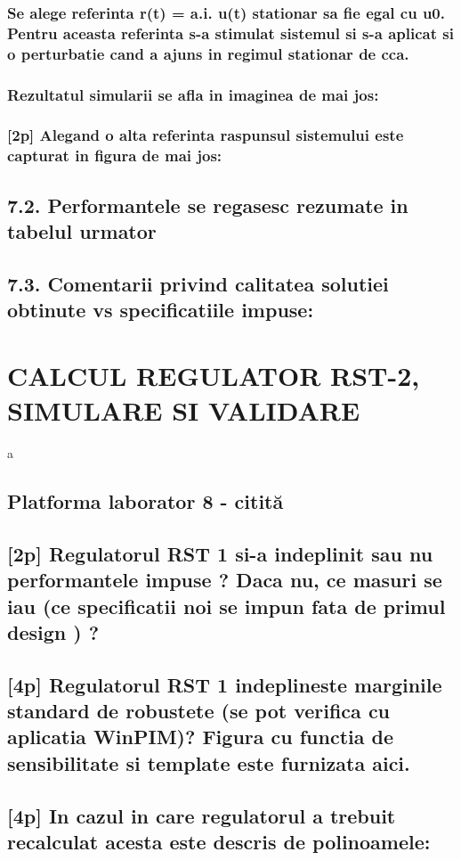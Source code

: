 \documentclass[12pt,english]{article}
\begin{document}
\subsubsection {Se alege referinta r(t) = a.i. u(t) stationar sa fie egal cu u0. Pentru aceasta referinta s-a stimulat sistemul si s-a aplicat si o perturbatie cand a ajuns in regimul stationar de cca.}
\subsubsection {Rezultatul simularii se afla in imaginea de mai jos: }
\subsubsection {[2p] Alegand o alta referinta raspunsul sistemului este capturat in figura de mai jos: }
\subsection {7.2. Performantele se regasesc rezumate in tabelul urmator }
\subsection {7.3. Comentarii privind calitatea solutiei obtinute vs specificatiile impuse: }

\section {CALCUL REGULATOR RST-2, SIMULARE SI VALIDARE }
a
\subsection {Platforma laborator 8 - citită }
\subsection {[2p] Regulatorul RST 1 si-a indeplinit sau nu performantele impuse ?  Daca nu, ce masuri se iau (ce specificatii noi se impun fata de primul design ) ? }
\subsection {[4p] Regulatorul RST 1 indeplineste marginile standard de robustete (se pot verifica cu aplicatia WinPIM)?   Figura cu functia de sensibilitate si template este furnizata aici. }
\subsection {[4p] In cazul in care regulatorul a trebuit recalculat acesta este descris de polinoamele: }
\end{document}
